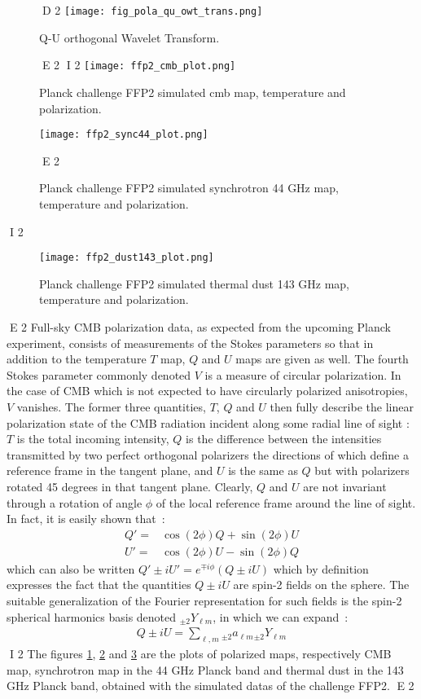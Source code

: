 \begin{figure}[htb]
D 2
\texttt{[image: fig\_pola\_qu\_owt\_trans.png]}
\caption{Q-U orthogonal Wavelet Transform.}
\label{fig_qu_owt_trans}
E 2
I 2
\texttt{[image: ffp2\_cmb\_plot.png]}
\caption{Planck challenge FFP2 simulated cmb map, temperature and polarization.}
\label{fig_ffp2_cmb_plot}
\end{figure}
\begin{figure}[htb]
\texttt{[image: ffp2\_sync44\_plot.png]}
\caption{Planck challenge FFP2 simulated synchrotron 44 GHz map, temperature and polarization.}
\label{fig_ffp2_sync44_plot}
E 2
\end{figure}
I 2
\begin{figure}[htb]
\texttt{[image: ffp2\_dust143\_plot.png]}
\caption{Planck challenge FFP2 simulated thermal dust 143 GHz map, temperature and polarization.}
\label{fig_ffp2_dust143_plot}
\end{figure}

E 2
Full-sky CMB polarization data, as expected from the upcoming Planck experiment, consists of measurements of the Stokes parameters so that in addition 
to the temperature $T$ map, $Q$ and $U$ maps are given as well. The fourth Stokes parameter commonly denoted $V$ is a measure of circular polarization. 
In the case of CMB which is not expected to have circularly polarized anisotropies, $V$ vanishes. The former three quantities, $T$, $Q$ and $U$ then 
fully describe the linear polarization state of the CMB radiation incident along some radial line of sight : $T$ is the total incoming intensity, $Q$ is 
the difference between the intensities transmitted by two perfect orthogonal polarizers the directions of which define a reference frame in the tangent 
plane, and $U$ is the same as $Q$ but with polarizers rotated 45 degrees in that tangent plane. Clearly, $Q$ and $U$ are not invariant through a rotation 
of angle $\phi$ of the local reference frame around the line of sight. In fact, it is easily shown that~:
\begin{eqnarray}
Q ' = & \cos (2 \phi) Q + \sin(2 \phi) U \\ \nonumber
U ' = & \cos (2 \phi) U - \sin(2 \phi) Q 
\end{eqnarray}
which can also be written $Q' \pm i U' = e^{\mp i\phi} ( Q \pm i U )$ which by definition expresses the fact that the quantities $Q \pm i U$ are 
spin-2 fields on the sphere. The suitable generalization of the Fourier representation for such fields is the spin-2 spherical harmonics basis 
denoted $_{\pm 2}Y_{\ell m}$, in which we can expand~: 
\begin{eqnarray}\label{QU}
Q \pm i U  = \sum_{\ell, m} { _{\pm 2}a_{\ell m}} {_{\pm 2}Y_{\ell m} }
\end{eqnarray}
I 2
The figures \ref{fig_ffp2_cmb_plot}, \ref{fig_ffp2_sync44_plot} and \ref{fig_ffp2_dust143_plot} are the plots of polarized maps, respectively CMB map, synchrotron map in the 44 GHz Planck band and thermal dust in the 143 GHz Planck band, obtained with the simulated datas of the challenge FFP2.
E 2

